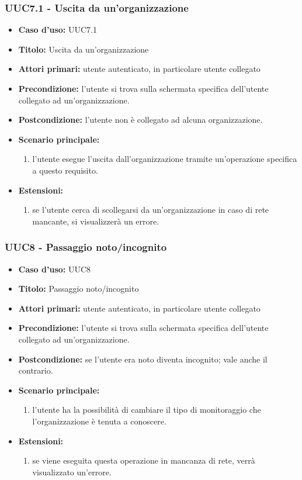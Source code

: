 \documentclass[casi-duso]{subfiles}
\begin{document}
\subsubsection{UUC7.1 - Uscita da un'organizzazione}
\label{subsub:UUC7.1utente}
\begin{itemize}
  \item \textbf{Caso d’uso:} UUC7.1
  \item \textbf{Titolo:} Uscita da un'organizzazione
  \item \textbf{Attori primari:} utente autenticato, in particolare utente collegato
  \item \textbf{Precondizione:} l'utente si trova sulla schermata specifica dell'utente collegato ad un'organizzazione.
  \item \textbf{Postcondizione:} l'utente non è collegato ad alcuna organizzazione.
  \item \textbf{Scenario principale:}
  \begin{enumerate}
    \item l'utente esegue l'uscita dall'organizzazione tramite un'operazione specifica a questo requisito.
  \end{enumerate}
  \item \textbf{Estensioni:}
  \begin{enumerate}
    \item se l'utente cerca di scollegarsi da un'organizzazione in caso di rete mancante, si visualizzerà un errore.
  \end{enumerate}
\end{itemize}

\subsubsection{UUC8 - Passaggio noto/incognito}
\label{subsub:UUC8utente}
\begin{itemize}
  \item \textbf{Caso d’uso:} UUC8
  \item \textbf{Titolo:} Passaggio noto/incognito
  \item \textbf{Attori primari:} utente autenticato, in particolare utente collegato
  \item \textbf{Precondizione:} l'utente si trova sulla schermata specifica dell'utente collegato ad un'organizzazione.
  \item \textbf{Postcondizione:} se l'utente era noto diventa incognito; vale anche il contrario.
  \item \textbf{Scenario principale:}
  \begin{enumerate}
    \item l'utente ha la possibilità di cambiare il tipo di monitoraggio che l'organizzazione è tenuta a conoscere.
  \end{enumerate}
  \item \textbf{Estensioni:}
  \begin{enumerate}
    \item se viene eseguita questa operazione in mancanza di rete, verrà visualizzato un'errore.
  \end{enumerate}
\end{itemize}
\end{document}
